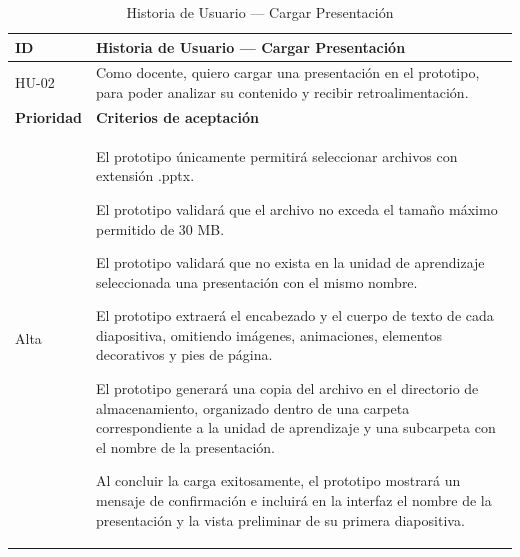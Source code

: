 \documentclass[11pt]{article}
\newcommand{\ttstyle}{%
  \small
  \setlength{\tabcolsep}{6pt}%
  \renewcommand{\arraystretch}{1.25}%
  \arrayrulecolor{azulprofundo}%
}
\newcommand{\hairrule}{%
  \arrayrulecolor{azulregla}\midrule[0.3pt]\arrayrulecolor{azulprofundo}%
}
\begin{document}
\begin{table}[H]
    \centering
    \renewcommand{\arraystretch}{1.2}
    \ttstyle
    \begin{tabular}{p{2.5cm}p{11cm}}
        \toprule
        \textbf{ID} & \textbf{Historia de Usuario --- Cargar Presentación} \\
        \midrule
        HU-02 & Como docente, quiero cargar una presentación en el prototipo, para poder analizar su contenido y recibir retroalimentación. \\
        \hairrule
        \textbf{Prioridad} & \textbf{Criterios de aceptación} \\
        \hairrule
        Alta & El prototipo únicamente permitirá seleccionar archivos con extensión .pptx. 
        
        El prototipo validará que el archivo no exceda el tamaño máximo permitido de 30 MB. 
        
        El prototipo validará que no exista en la unidad de aprendizaje seleccionada una presentación con el mismo nombre.
        
        El prototipo extraerá el encabezado y el cuerpo de texto de cada diapositiva, omitiendo imágenes, animaciones, elementos decorativos y pies de página.
        
        El prototipo generará una copia del archivo en el directorio de almacenamiento, organizado dentro de una carpeta correspondiente a la unidad de aprendizaje y una subcarpeta con el nombre de la presentación. 
        
        Al concluir la carga exitosamente, el prototipo mostrará un mensaje de confirmación e incluirá en la interfaz el nombre de la presentación y la vista preliminar de su primera diapositiva. \\
        \bottomrule
    \end{tabular}
    \caption{Historia de Usuario — Cargar Presentación}
    \label{tab:hu-cargar-presentacion}
\end{table}
\end{document}
